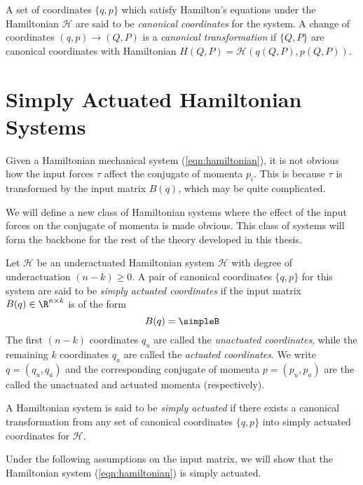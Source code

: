 A set of coordinates \(\{q,p\}\) which satisfy Hamilton's equations 
under the Hamiltonian \(\mathcal{H}\) are
said to be \textit{canonical coordinates} for the system. A change of
coordinates \((q,p) \rightarrow (Q,P)\) is a \textit{canonical
transformation} if \(\{Q,P\}\) are canonical coordinates with Hamiltonian
\(H(Q,P) = \mathcal{H}\left(q(Q,P), p(Q,P)\right)\).

\section{Simply Actuated Hamiltonian Systems}
Given a Hamiltonian mechanical system (\ref{eqn:hamiltonian}), it is not obvious
how the input forces \(\tau\) affect the conjugate of momenta \(p_i\). 
This is because \(\tau\) is transformed by the input matrix \(B(q)\), which may
be quite complicated. 

We will define a new class of Hamiltonian systems where the effect of the input
forces on the conjugate of momenta is made obvious. This class of systems will
form the backbone for the rest of the theory developed in this thesis.

\begin{defn}
    Let \(\mathcal{H}\) be an underactuated Hamiltonian system 
    \(\mathcal{H}\) with degree of underactuation \((n-k)\geq 0\). 
    A pair of canonical coordinates \(\{q,p\}\) for this system
    are said to be \textit{simply actuated coordinates} if the
    input matrix \(B(q) \in \R^{n \times k}\) is of the form
    \[
        B(q) = \simpleB    
    \]
    The first \((n-k)\) coordinates \(q_u\) are called the \textit{unactuated
    coordinates}, while the remaining \(k\) coordinates \(q_a\) are called the
    \textit{actuated coordinates}. We write \(q = (q_u, q_a)\) and the
    corresponding conjugate of momenta \(p = (p_u, p_a)\) are the called the
    unactuated and actuated momenta (respectively).
\end{defn}
\begin{defn}
    A Hamiltonian system is said to be \textit{simply actuated} if there exists
    a canonical transformation from any set of canonical coordinates 
    \(\{q,p\}\) into simply actuated coordinates for \(\mathcal{H}\).
\end{defn}

Under the following assumptions on the input matrix, we will show that the
Hamiltonian system (\ref{eqn:hamiltonian}) is simply actuated.

